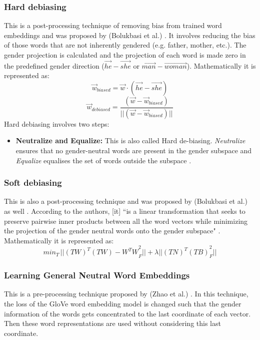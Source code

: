 \documentclass[12pt, a4paper]{article}
\begin{document}
			\subsubsection{Hard debiasing}
				This is a post-processing technique of removing bias from trained word embeddings and was proposed by (Bolukbasi et al.) \cite{2}. It involves reducing the bias of those words that are not inherently gendered (e.g. father, mother, etc.). The gender projection is calculated and the projection of each word is made zero in the predefined gender direction ($ \vec{he} - \vec{she}$ or $ \vec{man} - \vec{woman}$).
				Mathematically it is represented as:
				\[ 
					\vec{w}_{biased} = \vec{w}\cdot(\vec{he} - \vec{she}) 
				\]
				\[				
					\vec{w}_{debiased} = \frac{(\vec{w} - \vec{w}_{biased})}{||{(\vec{w} - \vec{w}_{biased})||}}
				 \]
				 Hard debiasing involves two steps:
				 \begin{itemize}
				 	\item \textbf{Neutralize and Equalize:} This is also called Hard de-biasing. \emph{Neutralize} ensures that no gender-neutral words are present in the gender subspace and \emph{Equalize} equalises the set of words outside the subspace \cite{2}.
				 \end{itemize}
			 
			 \subsubsection{Soft debiasing}
			 	This is also a post-processing technique and was proposed by (Bolukbasi et al.) as well \cite{2}. According to the authors, [it] ``is a linear transformation that seeks to preserve pairwise inner products between all the word vectors while minimizing the projection of the gender neutral words onto the gender subspace" \cite{2}. Mathematically it is represented as:
			 	\[
			 		min_T \, {||{(TW)^T(TW) - W^TW}^2_F||} + \lambda {||{(TN)^T(TB)}^2_F||}
			 	\]
			 	
		 	\subsubsection{Learning General Neutral Word Embeddings}
		 		This is a pre-processing technique proposed by (Zhao et al.) \cite{3}. In this technique, the loss of the GloVe word embedding model is changed such that the gender information of the words gets concentrated to the last coordinate of each vector. Then these word representations are used without considering this last coordinate.
		
\end{document}
